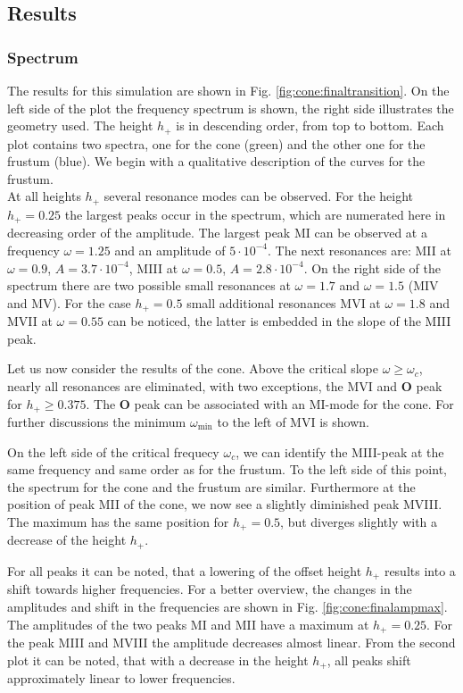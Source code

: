 \subsection{Results}%
\subsubsection{Spectrum}

The results for this simulation are shown in Fig. \ref{fig:cone:finaltransition}.
On the left side of the plot  the frequency spectrum is shown, the right side illustrates the geometry used.
The height $h_+$ is in descending order, from top to bottom.
Each plot contains two spectra, one for the cone (green)  and the other one for the frustum (blue).
We begin with a qualitative description of the curves for the frustum.\\
At all heights $h_+$ several resonance modes can be observed. For the height ${h_+=0.25}$
the largest peaks occur in the spectrum, which are numerated here in decreasing order of the amplitude.
The largest peak M\RN{1} can be observed at a frequency $\omega=1.25$ and an amplitude of $5\cdot10^{-4}$.
The next resonances are: M\RN{2} at $\omega=0.9$, $A=3.7\cdot10^{-4}$, M\RN{3} at $\omega=0.5$,  $A=2.8\cdot10^{-4}$.
On the right side of the spectrum there are two possible small resonances at $\omega=1.7$ and $\omega=1.5$ (M\RN{4} and M\RN{5}).
For the case $h_+=0.5$  small additional resonances  M\RN{6} at $\omega=1.8$ and M\RN{7} at $\omega=0.55$ can be noticed,
the latter is embedded in the slope of the M\RN{3} peak.

Let us now consider the results of the cone.
Above the critical slope $\omega\geq\omega_c$, nearly all resonances are eliminated,
with two exceptions, the M\RN{6} and \textbf{O} peak for $h_+\geq0.375$.
The \textbf{O} peak can be associated with an M\RN{1}-mode for the cone.
For further discussions the minimum $\omega_{\text{min}}$ to the left of M\RN{6} is shown.

On the left side of the critical frequecy $\omega_c$, we can identify the M\RN{3}-peak
at the same frequency and same order as for the frustum. To the left side of this point, the spectrum for
the cone and the frustum are similar.
Furthermore at the position of peak M\RN{2} of the cone, we now see a slightly diminished peak M\RN{8}.
The maximum has the same position for $h_+=0.5$, but diverges slightly with a decrease of the height $h_+$.

For all peaks  it can be noted, that a lowering of the offset height $h_+$ results
into a shift towards higher frequencies. %
For a better overview, the changes in the amplitudes and shift in the frequencies are shown in
Fig. \ref{fig:cone:finalampmax}. %
The amplitudes of the two peaks M\RN{1} and M\RN{2} have a maximum at $h_+= 0.25$. For the peak M\RN{3} and M\RN{8} the amplitude decreases almost linear.
From the second plot it can be noted, that with a decrease in the height $h_+$,
all peaks shift approximately linear to lower frequencies.

